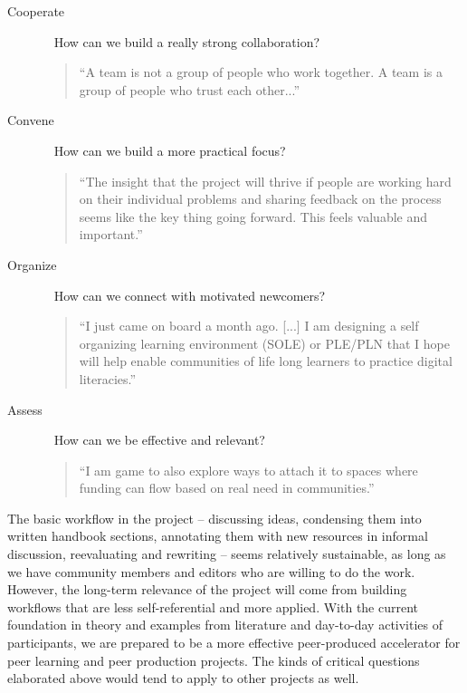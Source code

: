 \documentclass{acm_proc_article-sp}
\begin{document}
\begin{description}
\item[Cooperate] ~ How can we build a really strong collaboration?
\begin{quote}``A team is not a group of people who work together. A team is a group of people who trust each other...''
\end{quote}
\item[Convene] ~ How can we build a more practical focus?
\begin{quote}``The insight that the project will thrive if people are working hard on their individual problems and sharing feedback on the process seems like the key thing going forward. This feels valuable and important.''\end{quote}
\item[Organize] ~ How can we connect with motivated newcomers?
\begin{quote}``I just came on board a month ago. [...] I am designing a self organizing learning environment (SOLE) or PLE/PLN that I hope will help enable communities of life long learners to practice digital literacies.''
\end{quote}
\item[Assess] ~ How can we be effective and relevant?
\begin{quote}``I am game to also explore ways to attach it to spaces where funding can flow based on real need in communities.''
\end{quote}
\end{description}

The basic workflow in the project -- discussing ideas, condensing them into written handbook sections, annotating them with new resources in informal discussion, reevaluating and rewriting -- seems relatively sustainable, as long as we have community members and editors who are willing to do the work. However, the long-term relevance of the project will come from building workflows that are less self-referential and more applied. With the current foundation in theory and examples from literature and day-to-day activities of participants, we are prepared to be a more effective peer-produced accelerator for peer learning and peer production projects. The kinds of critical questions elaborated above would tend to apply to other projects as well.
\end{document}
